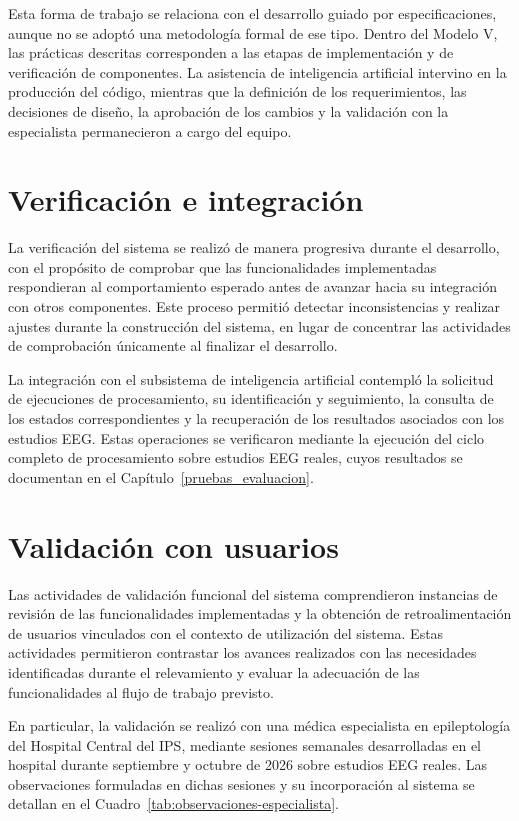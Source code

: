 Esta forma de trabajo se relaciona con el desarrollo guiado por especificaciones, aunque no se adoptó una metodología formal de ese tipo.
Dentro del Modelo V, las prácticas descritas corresponden a las etapas de implementación y de verificación de componentes.
La asistencia de inteligencia artificial intervino en la producción del código, mientras que la definición de los requerimientos, las decisiones de diseño, la aprobación de los cambios y la validación con la especialista permanecieron a cargo del equipo.

\section{Verificación e integración}
\label{sec:verificacion-integracion}

La verificación del sistema se realizó de manera progresiva durante el
desarrollo, con el propósito de comprobar que las funcionalidades
implementadas respondieran al comportamiento esperado antes de avanzar hacia
su integración con otros componentes. Este proceso permitió detectar
inconsistencias y realizar ajustes durante la construcción del sistema, en
lugar de concentrar las actividades de comprobación únicamente al finalizar
el desarrollo.

La integración con el subsistema de inteligencia artificial contempló
la solicitud de ejecuciones de procesamiento, su identificación y
seguimiento, la consulta de los estados correspondientes y la
recuperación de los resultados asociados con los estudios EEG.
Estas operaciones se verificaron mediante la ejecución del ciclo completo de procesamiento sobre estudios EEG reales, cuyos resultados se documentan en el Capítulo~\ref{pruebas_evaluacion}.

\section{Validación con usuarios}
\label{sec:validacion-usuarios}

Las actividades de validación funcional del sistema comprendieron
instancias de revisión de las funcionalidades implementadas y la
obtención de retroalimentación de usuarios vinculados con el
contexto de utilización del sistema. Estas actividades permitieron
contrastar los avances realizados con las necesidades identificadas
durante el relevamiento y evaluar la adecuación de las
funcionalidades al flujo de trabajo previsto.

En particular, la validación se realizó con una médica especialista en epileptología del Hospital Central del IPS, mediante sesiones semanales desarrolladas en el hospital durante septiembre y octubre de 2026 sobre estudios EEG reales.
Las observaciones formuladas en dichas sesiones y su incorporación al sistema se detallan en el Cuadro~\ref{tab:observaciones-especialista}.

